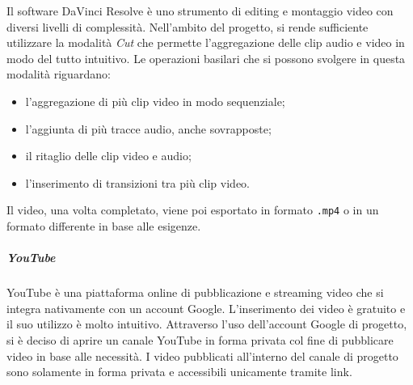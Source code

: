 		Il software DaVinci Resolve è uno strumento di editing e montaggio video con diversi livelli di complessità. Nell'ambito del progetto, si rende sufficiente utilizzare la modalità \textit{Cut} che permette l'aggregazione delle clip audio e video in modo del tutto intuitivo. Le operazioni basilari che si possono svolgere in questa modalità riguardano:
		\begin{itemize}
			\item l'aggregazione di più clip video in modo sequenziale;
			\item l'aggiunta di più tracce audio, anche sovrapposte;
			\item il ritaglio delle clip video e audio;
			\item l'inserimento di transizioni tra più clip video.
		\end{itemize}
		Il video, una volta completato, viene poi esportato in formato \verb!.mp4! o in un formato differente in base alle esigenze.

		\subparagraph{YouTube}

		YouTube è una piattaforma online di pubblicazione e streaming video che si integra nativamente con un account Google. L'inserimento dei video è gratuito e il suo utilizzo è molto intuitivo.
		Attraverso l'uso dell'account Google di progetto, si è deciso di aprire un canale YouTube in forma privata col fine di pubblicare video in base alle necessità. I video pubblicati all'interno del canale di progetto sono solamente in forma privata e accessibili unicamente tramite link.
  


